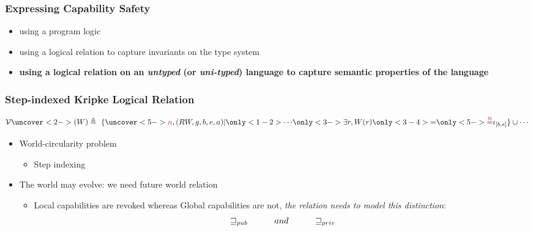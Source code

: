 \documentclass{beamer}
\newcommand\myeq[1]{\stackrel{\mathclap{\normalfont\mbox{#1}}}{=}}
\begin{document}
\begin{frame}
\frametitle{Expressing Capability Safety}

\begin{itemize}
	\item<2-> using a program logic 
	\item<3-> using a logical relation to capture invariants on the type system
	\item<4-> \textbf{using a logical relation on an \emph{untyped} (or \emph{uni-typed}) language to capture semantic properties of the language}
\end{itemize}

\end{frame}

\begin{frame}
\frametitle{Step-indexed Kripke Logical Relation}
 
$$ \mathcal{V}\uncover<2->{(W)}\triangleq~\{\uncover<5->{{\color{red}n}}, (RW, g, b, e, a) | \only<1-2>{\cdots} \only<3->{\exists r, W(r) \only<3-4>{=} \only<5->{\myeq{\small {\color{red} n}}} \iota_{[b,e]}} \} \cup \cdots $$
 
 \begin{itemize}
 	\item<4-> World-circularity problem
 		\begin{itemize}
 			\item<5-> {\color{red} Step indexing}
 		\end{itemize}
 	\item<6-> The world may evolve: we need future world relation
 		\begin{itemize}
 			\item<7-> Local capabilities are revoked whereas Global capabilities are not, \textit{the relation needs to model this distinction}:
 			$$ \sqsupseteq_{pub} \hspace{1 cm} and \hspace{1 cm} \sqsupseteq_{priv} $$
 		\end{itemize}
 \end{itemize}

\end{frame}
\end{document}
